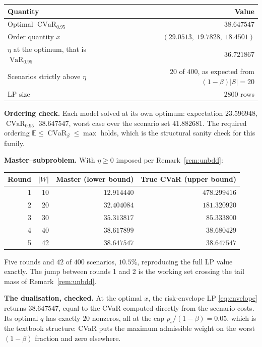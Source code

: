 \documentclass[11pt]{article}
\DeclareMathOperator{\CVaR}{CVaR}
\DeclareMathOperator{\VaR}{VaR}
\theoremstyle{definition}
\begin{document}
\begin{center}
\begin{tabular}{@{}lr@{}}
\toprule
Quantity & Value \\
\midrule
Optimal $\CVaR_{0.95}$ & $38.647547$ \\
Order quantity $x$ & $(29.0513,\; 19.7828,\; 18.4501)$ \\
$\eta$ at the optimum, that is $\VaR_{0.95}$ & $36.721867$ \\
Scenarios strictly above $\eta$ & $20$ of $400$, as expected from
  $(1-\beta)|S| = 20$ \\
LP size & $2800$ rows \\
\bottomrule
\end{tabular}
\end{center}

\textbf{Ordering check.} Each model solved at its own optimum:
expectation $23.596948$, $\CVaR_{0.95}$ $38.647547$, worst case over the
scenario set $41.882681$. The required ordering
$\mathbb{E} \le \CVaR_\beta \le \max$ holds, which is the structural
sanity check for this family.

\textbf{Master--subproblem.} With $\eta \ge 0$ imposed per
Remark~\ref{rem:unbdd}:

\begin{center}
\begin{tabular}{@{}rrrr@{}}
\toprule
Round & $|W|$ & Master (lower bound) & True CVaR (upper bound) \\
\midrule
1 & 10 & $12.914440$ & $478.299416$ \\
2 & 20 & $32.404084$ & $181.320920$ \\
3 & 30 & $35.313817$ & $85.333800$ \\
4 & 40 & $38.617899$ & $38.680429$ \\
5 & 42 & $38.647547$ & $38.647547$ \\
\bottomrule
\end{tabular}
\end{center}

Five rounds and $42$ of $400$ scenarios, $10.5\%$, reproducing the full
LP value exactly. The jump between rounds 1 and 2 is the working set
crossing the tail mass of Remark~\ref{rem:unbdd}.

\textbf{The dualisation, checked.} At the optimal $x$, the risk-envelope
LP \eqref{eq:envelope} returns $38.647547$, equal to the CVaR computed
directly from the scenario costs. Its optimal $q$ has exactly $20$
nonzeros, all at the cap $p_s/(1-\beta) = 0.05$, which is the textbook
structure: CVaR puts the maximum admissible weight on the worst
$(1-\beta)$ fraction and zero elsewhere.
\end{document}

